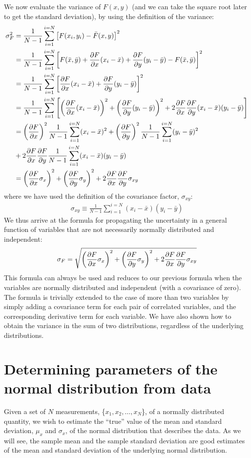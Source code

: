 We now evaluate the variance of $F(x,y)$ (and we can take the square root later to get the standard deviation), by using the definition of the variance:
\begin{align}
\sigma_F^2&=\frac{1}{N-1}\sum_{i=1}^{i=N}\left[F(x_i,y_i)-\bar F(x,y)\right]^2\nonumber\\
&=\frac{1}{N-1}\sum_{i=1}^{i=N}\left[F(\bar x,\bar y)+\frac{\partial F}{\partial x}(x_i-\bar x)+\frac{\partial F}{\partial y}(y_i-\bar y)-F(\bar x,\bar y)\right]^2\nonumber\\
&=\frac{1}{N-1}\sum_{i=1}^{i=N}\left[\frac{\partial F}{\partial x}(x_i-\bar x)+\frac{\partial F}{\partial y}(y_i-\bar y)\right]^2\nonumber\\
&=\frac{1}{N-1}\sum_{i=1}^{i=N}\left[\left(\frac{\partial F}{\partial x}(x_i-\bar x)\right)^2+\left(\frac{\partial F}{\partial y}(y_i-\bar y)\right)^2+2 \frac{\partial F}{\partial x}\frac{\partial F}{\partial y}(x_i-\bar x) (y_i-\bar y) \right]\nonumber\\
&=\left(\frac{\partial F}{\partial x}\right)^2\frac{1}{N-1}\sum_{i=1}^{i=N}(x_i-\bar x)^2+\left(\frac{\partial F}{\partial y}\right)^2\frac{1}{N-1}\sum_{i=1}^{i=N}(y_i-\bar y)^2\nonumber\\
&+2\frac{\partial F}{\partial x}\frac{\partial F}{\partial y}\frac{1}{N-1}\sum_{i=1}^{i=N}(x_i-\bar x) (y_i-\bar y)\nonumber\\
&=\left(\frac{\partial F}{\partial x}\sigma_x\right)^2+\left(\frac{\partial F}{\partial y}\sigma_y\right)^2+2\frac{\partial F}{\partial x}\frac{\partial F}{\partial y}\sigma_{xy}
\end{align}
where we have used the definition of the covariance factor, $\sigma_{xy}$:
\begin{align}
\sigma_{xy}\equiv\frac{1}{N-1}\sum_{i=1}^{i=N}(x_i-\bar x) (y_i-\bar y)
\end{align}
We thus arrive at the formula for propagating the uncertainty in a general function of variables that are not necessarily normally distributed and independent:
\begin{align}
\label{eqn:coverror}
\sigma_F=\sqrt{\left(\frac{\partial F}{\partial x}\sigma_x\right)^2+\left(\frac{\partial F}{\partial y}\sigma_y\right)^2+2\frac{\partial F}{\partial x}\frac{\partial F}{\partial y}\sigma_{xy}}
\end{align} 
This formula can always be used and reduces to our previous formula when the variables are normally distributed and independent (with a covariance of zero). The formula is trivially extended to the case of more than two variables by simply adding a covariance term for each pair of correlated variables, and the corresponding derivative term for each variable. We have also shown how to obtain the variance in the sum of two distributions, regardless of the underlying distributions.

\section{Determining parameters of the normal distribution from data}
Given a set of $N$ measurements, \{$x_1, x_2, \dots, x_N$\}, of a normally distributed quantity, we wish to estimate the ``true'' value of the mean and standard deviation, $\mu_x$ and $\sigma_x$, of the normal distribution that describes the data. As we will see, the sample mean and the sample standard deviation are good estimates of the mean and standard deviation of the underlying normal distribution.

